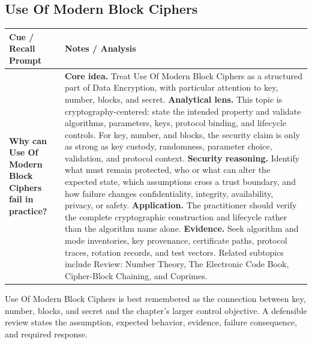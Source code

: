 \documentclass[11pt]{article}
\newcommand{\CornellHeader}{%
\rowcolor{Navy}\color{white}\bfseries Cue / Recall Prompt & \color{white}\bfseries Notes / Analysis\\\hline}
\newcommand{\CornellRow}[2]{%
\cellcolor{CueGray}\RaggedRight\textbf{#1} & \RaggedRight #2\\\hline}
\begin{document}
\subsection*{Use Of Modern Block Ciphers}
\begin{longtable}{>{\RaggedRight\arraybackslash}p{}|>{\RaggedRight\arraybackslash}p{}}
\CornellHeader
\CornellRow{Why can Use Of Modern Block Ciphers fail in practice?}{\textbf{Core idea.} Treat Use Of Modern Block Ciphers as a structured part of Data Encryption, with particular attention to key, number, blocks, and secret. \textbf{Analytical lens.} This topic is cryptography-centered: state the intended property and validate algorithms, parameters, keys, protocol binding, and lifecycle controls. For key, number, and blocks, the security claim is only as strong as key custody, randomness, parameter choice, validation, and protocol context. \textbf{Security reasoning.} Identify what must remain protected, who or what can alter the expected state, which assumptions cross a trust boundary, and how failure changes confidentiality, integrity, availability, privacy, or safety. \textbf{Application.} The practitioner should verify the complete cryptographic construction and lifecycle rather than the algorithm name alone. \textbf{Evidence.} Seek algorithm and mode inventories, key provenance, certificate paths, protocol traces, rotation records, and test vectors. Related subtopics include Review: Number Theory, The Electronic Code Book, Cipher-Block Chaining, and Coprimes.}
\end{longtable}
\begin{topicsummary}
Use Of Modern Block Ciphers is best remembered as the connection between key, number, blocks, and secret and the chapter's larger control objective. A defensible review states the assumption, expected behavior, evidence, failure consequence, and required response.
\end{topicsummary}
\end{document}
